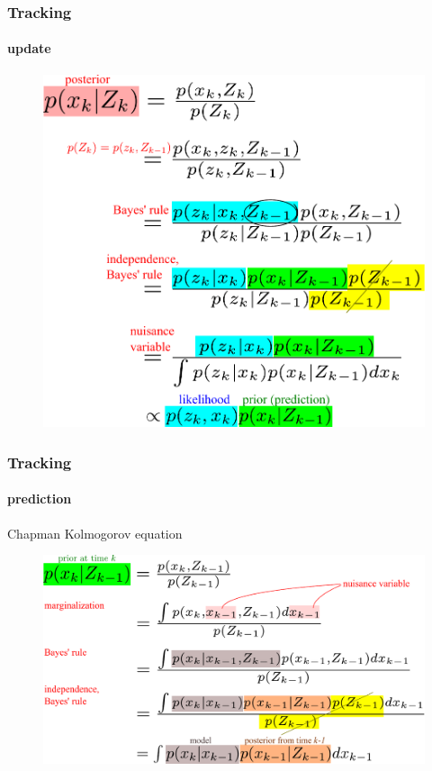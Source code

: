\begin{frame}
\frametitle{Tracking}
\framesubtitle{update}
\logoCSIPCPL\mypagenum
	\begin{figure}
		\includegraphics[width=1.0\textwidth]{thesis/TRK_EQN_update.pdf}
	\end{figure}
\end{frame}



\begin{frame}
\frametitle{Tracking}
\framesubtitle{prediction}
\logoCSIPCPL\mypagenum
	Chapman Kolmogorov equation
	\begin{figure}
		\includegraphics[width=1.0\textwidth]{thesis/TRK_EQN_prediction.pdf}
	\end{figure}
\end{frame}


